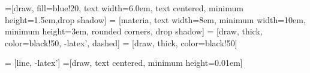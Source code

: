  \usepackage[T1]{fontenc}
 \usepackage[utf8]{inputenc}
 \usepackage{lmodern}
 \usepackage[french]{babel} \usepackage{lmodern}


\usepackage[a4paper, margin=2.5cm]{geometry}	%
\usepackage{arev}									%
\renewcommand{\baselinestretch}{1.15} 				%
\setlength\parindent{4pt}							%
\usepackage[skip=5pt,font=footnotesize]{caption}
\usepackage{float}
\usepackage{xcolor}									%
\usepackage{tabu}
\usepackage{changepage}

\usepackage{hyperref}								%
\usepackage{amsmath}								%
\usepackage{listings}								%
\usepackage[refpage]{nomencl}						%
\usepackage{xpatch}
\makenomenclature

\usepackage{graphicx}
\usepackage{epstopdf}
\usepackage{subcaption}
\usepackage{tikz}
\usepackage{includes/tikz-uml}
\usetikzlibrary{calc,trees,positioning,arrows,chains,shapes.geometric,%
    decorations.pathreplacing,decorations.pathmorphing,shapes,%
    matrix,shapes.symbols,fit}


=[draw, fill=blue!20, text width=6.0em, text centered,
  minimum height=1.5em,drop shadow]
 = [materia, text width=8em, minimum width=10em,
  minimum height=3em, rounded corners, drop shadow]
 = [draw, thick, color=black!50, -latex', dashed]
 = [draw, thick, color=black!50]

 = [line, -latex']
=[draw, text centered, minimum height=0.01em]

\newcommand{\blockdist}{1.3}
\newcommand{\edgedist}{1.5}

\newcommand{\module}[2]{node (p#1) [module]
  {#2}}